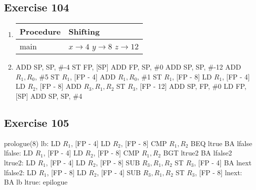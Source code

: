 \documentclass[12pt,fleqn]{article}		%
\begin{document}
\subsection{Exercise 104}
\begin{enumerate}
\item 
\begin{tabularx}{\textwidth}{| l | X |}
\hline
Procedure & Shifting\\
\hline
main & $x \rightarrow 4$ \newline $y \rightarrow 8$ \newline $z \rightarrow 12$\\
\hline
\end{tabularx}
\item 
\begin{algorithmic}
\State ADD SP, SP, \#-4
\State ST FP, [SP]
\State ADD FP, SP, \#0
\State ADD SP, SP, \#-12
\State 
\State ADD $R_1, R_0$, \#5
\State ST $R_1$, [FP - 4]
\State ADD $R_1, R_0$, \#1
\State ST $R_1$, [FP - 8]
\State LD $R_1$, [FP - 4]
\State LD $R_2$, [FP - 8]
\State ADD $R_3, R_1, R_2$
\State ST $R_3$, [FP - 12]
\State 
\State ADD SP, FP, \#0
\State LD FP, [SP]
\State ADD SP, SP, \#4
\end{algorithmic}
\end{enumerate}

\subsection{Exercise 105}
\begin{algorithmic}
\State prologue(8)
\State lb:
\State LD $R_1$, [FP - 4]
\State LD $R_2$, [FP - 8]
\State CMP $R_1, R_2$
\State BEQ ltrue
\State BA lfalse
\State lfalse:
\State LD $R_1$, [FP - 4]
\State LD $R_2$, [FP - 8]
\State CMP $R_1, R_2$
\State BGT ltrue2
\State BA lfalse2
\State ltrue2:
\State LD $R_1$, [FP - 4]
\State LD $R_2$, [FP - 8]
\State SUB $R_3, R_1, R_2$
\State ST $R_3$, [FP - 4]
\State BA lnext
\State lfalse2:
\State LD $R_1$, [FP - 8]
\State LD $R_2$, [FP - 4]
\State SUB $R_3, R_1, R_2$
\State ST $R_3$, [FP - 8]
\State lnext:
\State BA lb
\State ltrue:
\State epilogue
\end{algorithmic}
\end{document}

